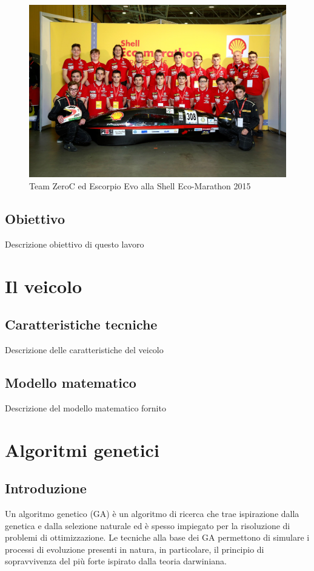 \documentclass[12pt,a4paper]{article}
\begin{document}
\begin{figure}
\hfill \includegraphics[scale=0.7]{foto2}
\caption{Team ZeroC ed Escorpio Evo alla Shell Eco-Marathon 2015}
\end{figure}
\newpage

\subsection{Obiettivo}
Descrizione obiettivo di questo lavoro
\newpage


\section{Il veicolo}
\subsection{Caratteristiche tecniche}
Descrizione delle caratteristiche del veicolo
\subsection{Modello matematico}
Descrizione del modello matematico fornito
\newpage


\section{Algoritmi genetici}
\subsection{Introduzione}
Un algoritmo genetico (GA) è un algoritmo di ricerca che trae ispirazione dalla genetica e dalla selezione naturale ed è spesso impiegato per la risoluzione di problemi di ottimizzazione. Le tecniche alla base dei GA permettono di simulare i processi di evoluzione presenti in natura, in particolare, il principio di sopravvivenza del più forte ispirato dalla teoria darwiniana. 
\end{document}
